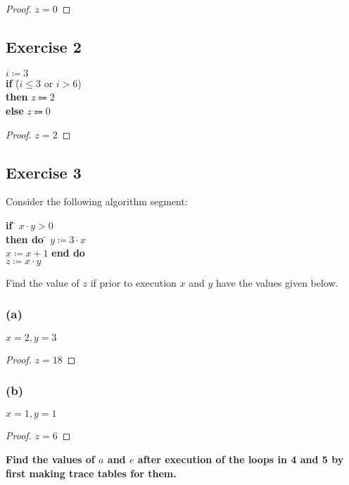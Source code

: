 \documentclass[14pt]{extarticle}
\newcommand{\cy}{\color{cyan}}
\begin{document}
\begin{proof}
    $z = 0$
\end{proof}

\subsection{Exercise 2}
\begin{tabbing}
    $i \coloneqq 3$ \\
    {\bf if} \= ($i \leq 3$ or $i > 6$) \\
    \> {\bf then} $z \Coloneqq 2$ \\
    \> {\bf else} $z \Coloneqq 0$
\end{tabbing}

\begin{proof}
    $z = 2$
\end{proof}

\subsection{Exercise 3}
Consider the following algorithm segment:
\begin{tabbing}
    {\bf if} \= $x \cdot y > 0$ \\
    \> {\bf then do} \= $y \coloneqq 3\cdot x$ \\
    \>               \> $x \coloneqq x+1$ {\bf end do} \\
    $z \coloneqq x \cdot y$
\end{tabbing}
Find the value of $z$ if prior to execution $x$ and $y$ have the values given below.

\subsubsection{(a)}
$x = 2, y = 3$

\begin{proof}
    $z = 18$
\end{proof}

\subsubsection{(b)}
$x = 1, y = 1$

\begin{proof}
    $z = 6$
\end{proof}

{\bf \cy Find the values of $a$ and $e$ after execution of the loops in 4 and 5 by first making trace tables for them.}
\end{document}
